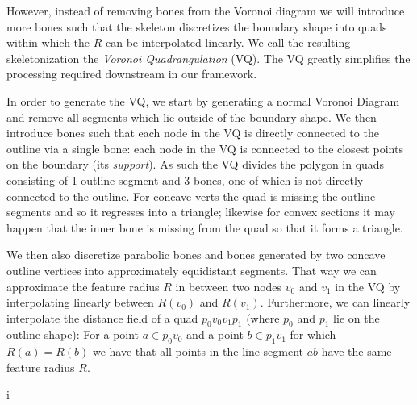 However, instead of removing bones from the Voronoi diagram we will introduce more bones such that the skeleton discretizes the boundary shape into quads within which the $R$ can be interpolated linearly.
We call the resulting skeletonization the \emph{Voronoi Quadrangulation} (VQ).
The VQ greatly simplifies the processing required downstream in our framework.

In order to generate the VQ, we start by generating a normal Voronoi Diagram and remove all segments which lie outside of the boundary shape.
We then introduce bones such that each node in the VQ is directly connected to the outline via a single bone:
each node in the VQ is connected to the closest points on the boundary (its \emph{support}).
As such the VQ divides the polygon in quads consisting of 1 outline segment and 3 bones, one of which is not directly connected to the outline.
For concave verts the quad is missing the outline segments and so it regresses into a triangle;
likewise for convex sections it may happen that the inner bone is missing from the quad so that it forms a triangle.

We then also discretize parabolic bones and bones generated by two concave outline vertices into approximately equidistant segments.
That way we can approximate the feature radius $R$ in between two nodes $v_0$ and $v_1$ in the VQ by interpolating linearly between $R(v_0)$ and $R(v_1)$.
Furthermore, we can linearly interpolate the distance field of a quad $p_0v_0v_1p_1$ (where $p_0$ and $p_1$ lie on the outline shape):
For a point $a \in p_0v_0$ and a point $b \in p_1v_1$ for which $R(a) = R(b)$ we have that all points in the line segment $ab$ have the same feature radius $R$.

i

